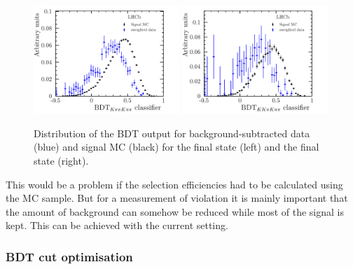 \begin{figure}[htbp]
    \centering
    \includegraphics[width=0.49\textwidth]{07-B02DD/tikz/pdf/BDTComparison_Kpipi.pdf}
    \includegraphics[width=0.49\textwidth]{07-B02DD/tikz/pdf/BDTComparison_KKpi.pdf}
    \caption{Distribution of the BDT output for background-subtracted data (blue) and
    signal MC (black) for the \KpipiKpipi final state (left) and the
    \KKpiKpipi final state (right).}
    \label{fig:b02dd:selection:mva:bdtcomparison}
\end{figure}
%
This would be a problem if the selection efficiencies had to be calculated
using the MC sample. But for a measurement of \CP violation it is mainly
important that the amount of background can somehow be reduced while most of
the signal is kept. This can be achieved with the current setting.

\subsubsection*{BDT cut optimisation}
\label{sec:b02dd:selection:mva:optimisation}


